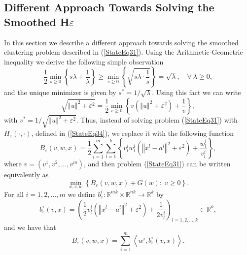 \documentclass[12pt]{article}
\numberwithin{equation}{section}
\newcommand{\rr}{\mathbb{R}} %
\newcommand{\norm}[1]{\left\Vert {#1} \right\Vert} %
\begin{document}
\subsection{Different Approach Towards Solving the Smoothed H$\varepsilon$}
In this section we describe a different approach towards solving the smoothed clustering problem described in (\ref{StateEq31}). Using the  Arithmetic-Geometric inequality we derive the following simple observation
\begin{equation*}
	\frac{1}{2} \min\limits_{s \geq 0} \left\lbrace s\lambda + \frac{1}{\lambda} \right\rbrace \geq \min\limits_{s \geq 0} \left\lbrace \sqrt{s\lambda \cdot \frac{1}{s}} \right\rbrace = \sqrt{\lambda}, \quad \forall \: \lambda \geq 0,
\end{equation*}
and the unique minimizer is given by $s^*=1/\sqrt{\lambda}$. Using this fact we can write
\begin{equation}
	\sqrt{\norm{u}^2 + {\varepsilon}^2} = \frac{1}{2}\min\limits_{v \geq 0} \left\lbrace v\left( \norm{u}^2 + {\varepsilon}^2\right) + \frac{1}{v} \right\rbrace , \label{AG_inq}
\end{equation}
with $v^* = 1/\sqrt{\norm{u}^2 + {\varepsilon}^2}$.
Thus, instead of solving problem (\ref{StateEq31}) with $H_\varepsilon(\cdot,\cdot)$, defined in (\ref{StateEq34}), we replace it with the following function
\begin{equation}
	B_{\varepsilon}(v,w,x) = \frac{1}{2}\sum\limits_{i=1}^{m} \sum\limits_{l=1}^{k} \left\lbrace v^i_lw^i_l \left( \norm{x^l-a^i}^2 +{\varepsilon}^2 \right) + \frac{w^i_l}{v^i_l} \right\rbrace ,
\end{equation}
where $v = \left(v^1, v^2, \ldots, v^m \right)$, and then problem (\ref{StateEq31}) can be written equivalently as
\begin{equation*}
	\min_{x,v,w} \left\lbrace B_{\varepsilon}(v,w,x) + G(w) : \; v \geq 0 \right\rbrace.
\end{equation*}
For all $i=1,2,\ldots,m$ we define $b^i_{\varepsilon}: \rr^{mk} \times \rr^{nk} \rightarrow \rr^{k}$ by
\begin{equation*}
	b^i_{\varepsilon}(v,x)= \left( \frac{1}{2} v^i_l \left( \norm{x^l-a^i}^2 +{\varepsilon}^2 \right) + \frac{1}{2v^i_l} \right)_{l=1,2,\ldots,k} \in \rr^{k} ,
\end{equation*}
and we have that
\begin{equation}
	B_{\varepsilon}(v,w,x) = \sum\limits_{i=1}^m \left\langle w^i, b^i_{\varepsilon}(v,x) \right\rangle . \label{B_eq_sum_b}
\end{equation}
\end{document}

